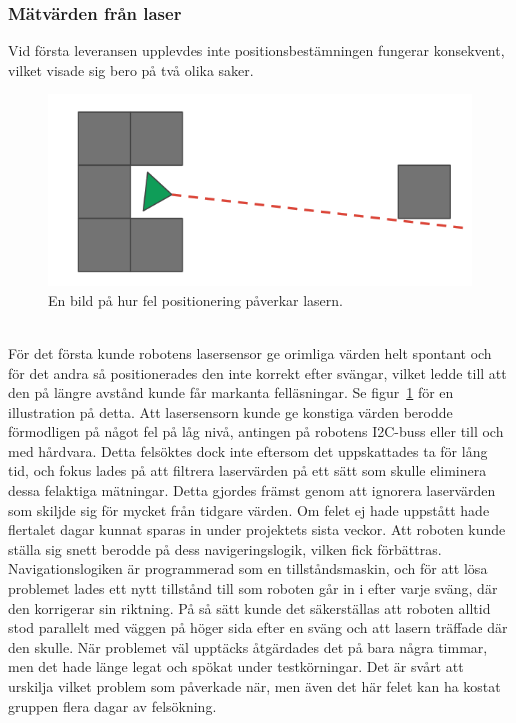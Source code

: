\documentclass{article}
\begin{document}
\subsubsection{Mätvärden från laser}
Vid första leveransen upplevdes inte positionsbestämningen fungerar konsekvent, vilket visade sig bero på två olika saker. 
\begin{figure}[H]
\centering
\includegraphics[scale=0.5]{wrongly_positioned_laser}
\caption{En bild på hur fel positionering påverkar lasern.}
\label{fig:wrongly_positioned_laser}
\end{figure}
\ \\
För det första kunde robotens lasersensor ge orimliga värden helt spontant och för det andra så positionerades den inte korrekt efter svängar, vilket ledde till att den på längre avstånd kunde får markanta felläsningar. Se figur~\ref{fig:wrongly_positioned_laser} för en illustration på detta.
\newline\newline
Att lasersensorn kunde ge konstiga värden berodde förmodligen på något fel på låg nivå, antingen på robotens I2C-buss eller till och med hårdvara. Detta felsöktes dock inte eftersom det uppskattades ta för lång tid, och fokus lades på att filtrera laservärden på ett sätt som skulle eliminera dessa felaktiga mätningar. Detta gjordes främst genom att ignorera laservärden som skiljde sig för mycket från tidgare värden. Om felet ej hade uppstått hade flertalet dagar kunnat sparas in under projektets sista veckor.
\newline\newline
Att roboten kunde ställa sig snett berodde på dess navigeringslogik, vilken fick förbättras. Navigationslogiken är programmerad som en tillståndsmaskin, och för att lösa problemet lades ett nytt tillstånd till som roboten går in i efter varje sväng, där den korrigerar sin riktning. På så sätt kunde det säkerställas att roboten alltid stod parallelt med väggen på höger sida efter en sväng och att lasern träffade där den skulle. När problemet väl upptäcks åtgärdades det på bara några timmar, men det hade länge legat och spökat under testkörningar. Det är svårt att urskilja vilket problem som påverkade när, men även det här felet kan ha kostat gruppen flera dagar av felsökning.
\end{document}
